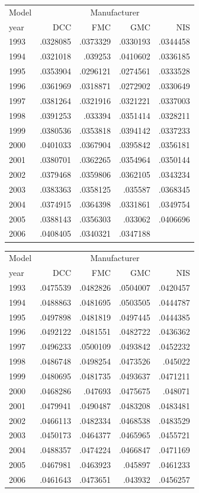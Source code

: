 \begin{tabular}{lrrrr}
\toprule
Model & \multicolumn{4}{c}{Manufacturer} \\
year & DCC & FMC & GMC & NIS \\
\midrule
1993 & .0328085 & .0373329 & .0330193 & .0344458 \\
1994 & .0321018 & .039253 & .0410602 & .0336185 \\
1995 & .0353904 & .0296121 & .0274561 & .0333528 \\
1996 & .0361969 & .0318871 & .0272902 & .0330649 \\
1997 & .0381264 & .0321916 & .0321221 & .0337003 \\
1998 & .0391253 & .033394 & .0351414 & .0328211 \\
1999 & .0380536 & .0353818 & .0394142 & .0337233 \\
2000 & .0401033 & .0367904 & .0395842 & .0356181 \\
2001 & .0380701 & .0362265 & .0354964 & .0350144 \\
2002 & .0379468 & .0359806 & .0362105 & .0343234 \\
2003 & .0383363 & .0358125 & .035587 & .0368345 \\
2004 & .0374915 & .0364398 & .0331861 & .0349754 \\
2005 & .0388143 & .0356303 & .033062 & .0406696 \\
2006 & .0408405 & .0340321 & .0347188 &  \\
\bottomrule
\end{tabular}

\begin{tabular}{lrrrr}
\toprule
Model & \multicolumn{4}{c}{Manufacturer} \\
year & DCC & FMC & GMC & NIS \\
\midrule
1993 & .0475539 & .0482826 & .0504007 & .0420457 \\
1994 & .0488863 & .0481695 & .0503505 & .0444787 \\
1995 & .0497898 & .0481819 & .0497445 & .0444385 \\
1996 & .0492122 & .0481551 & .0482722 & .0436362 \\
1997 & .0496233 & .0500109 & .0493842 & .0452232 \\
1998 & .0486748 & .0498254 & .0473526 & .045022 \\
1999 & .0480695 & .0481735 & .0493637 & .0471211 \\
2000 & .0468286 & .047693 & .0475675 & .048071 \\
2001 & .0479941 & .0490487 & .0483208 & .0483481 \\
2002 & .0466113 & .0482334 & .0468538 & .0483529 \\
2003 & .0450173 & .0464377 & .0465965 & .0455721 \\
2004 & .0488357 & .0474224 & .0466847 & .0471169 \\
2005 & .0467981 & .0463923 & .045897 & .0461233 \\
2006 & .0461643 & .0473651 & .043932 & .0456257 \\
\bottomrule
\end{tabular}

